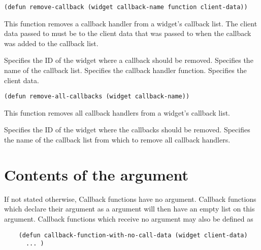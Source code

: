 \begin{lispd}
\syntax\begin{verbatim}
(defun remove-callback (widget callback-name function client-data))
\end{verbatim}
\beschr This function removes a callback handler from a widget's callback list. 
The client data passed to  must be  to the
client data that was passed to  when the callback was added
to the callback list. 
\parameter
\begin{paramd}
 Specifies the ID of the widget where a callback should be 
removed.
 Specifies the name of the callback list.
 Specifies the callback handler function.
 Specifies the client data.
\end{paramd}
\end{lispd}

\begin{lispd}
\syntax\begin{verbatim}
(defun remove-all-callbacks (widget callback-name))
\end{verbatim}
\beschr This function removes all callback handlers from a widget's callback 
list.
\parameter
\begin{paramd}
  Specifies the ID of the widget where the callbacks should be
removed.
 Specifies the name of the callback list from which to 
remove all callback handlers.
\end{paramd}
\end{lispd}

\section{Contents of the  argument}\label{sec:calldata}

If not stated otherwise, Callback functions have no  argument.
Callback functions which declare their  argument as a 
 argument will then have an empty list on this argument. Callback
functions which receive no  argument may also be defined as

\begin{verbatim}
    (defun callback-function-with-no-call-data (widget client-data)
      ... )
\end{verbatim}

